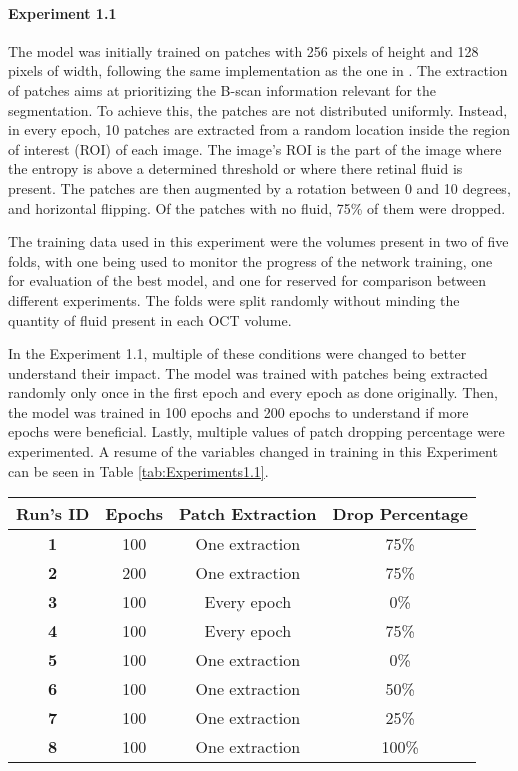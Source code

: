 \paragraph{Experiment 1.1}
The model was initially trained on patches with 256 pixels of height and 128 pixels of width, following the same implementation as the one in \textcite{Tennakoon2018}. The extraction of patches aims at prioritizing the B-scan information relevant for the segmentation. To achieve this, the patches are not distributed uniformly. Instead, in every epoch, 10 patches are extracted from a random location inside the region of interest (ROI) of each image. The image's ROI is the part of the image where the entropy is above a determined threshold or where there retinal fluid is present. The patches are then augmented by a rotation between 0 and 10 degrees, and horizontal flipping. Of the patches with no fluid, 75\% of them were dropped.
\par
The training data used in this experiment were the volumes present in two of five folds, with one being used to monitor the progress of the network training, one for evaluation of the best model, and one for reserved for comparison between different experiments. The folds were split randomly without minding the quantity of fluid present in each OCT volume.
\par
In the Experiment 1.1, multiple of these conditions were changed to better understand their impact. The model was trained with patches being extracted randomly only once in the first epoch and every epoch as done originally. Then, the model was trained in 100 epochs and 200 epochs to understand if more epochs were beneficial. Lastly, multiple values of patch dropping percentage were experimented. A resume of the variables changed in training in this Experiment can be seen in Table \ref{tab:Experiments1.1}.

\begin{table*}[!ht]
	\setlength{\tabcolsep}{6pt}
	\renewcommand{\arraystretch}{1.3}
	\caption{Parameters of each run in Experiment 1.1.}
	\centering
	\begin{tabular}{|c|c|c|c|}
		\hline
		\textbf{Run's ID} & \textbf{Epochs} & \textbf{Patch Extraction} & \textbf{Drop Percentage}\\
		\hline
		\textbf{1} & 100 & One extraction & 75\% \\
		\textbf{2} & 200 & One extraction & 75\% \\
		\textbf{3} & 100 & Every epoch & 0\% \\
		\textbf{4} & 100 & Every epoch & 75\% \\
		\textbf{5} & 100 & One extraction & 0\% \\
		\textbf{6} & 100 & One extraction & 50\% \\
		\textbf{7} & 100 & One extraction & 25\% \\
		\textbf{8} & 100 & One extraction & 100\% \\
		\hline
	\end{tabular}
	\label{tab:Experiments1.1}
\end{table*}

